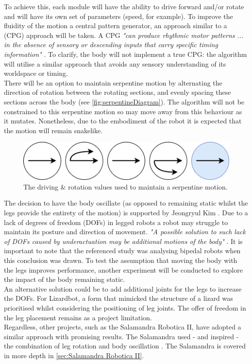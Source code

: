 \documentclass{article}
\begin{document}
\noindent To achieve this, each module will have the ability to drive forward and/or rotate and will have its own set of parameters (speed, for example). To improve the fluidity of the motion a central pattern generator, an approach similar to a (CPG) approach will be taken. A CPG \textit{"can produce rhythmic motor patterns ... in the absence of sensory or descending inputs that carry specific timing information"} . To clarify, the body will not implement a true CPG: the algorithm will utilise a similar approach that avoids any sensory understanding of its worldspace or timing.\\

\noindent There will be an option to maintain serpentine motion by alternating the direction of rotation between the rotating sections, and evenly spacing these sections across the body (see \autoref{fig:serpentineDiagram}). The algorithm will not be constrained to this serpentine motion so may move away from this behaviour as it mutates. Nonetheless, due to the embodiment of the robot it is expected that the motion will remain snakelike.\\
\begin{figure}[H]
\centering
\includegraphics[scale=0.6]{serpentineDiagram}
\caption{The driving \& rotation values used to maintain a serpentine motion.}
\label{fig:serpentineDiagram}
\end{figure}

The decision to have the body oscillate (as opposed to remaining static whilst the legs provide the entirety of the motion) is supported by Jeongryul Kim . Due to a lack of degrees of freedom (DOFs) in legged robots a robot may struggle to maintain its posture and direction of movement. \textit{"A possible solution to such lack of DOFs caused by underactuation may be additional motions of the body"} .
It is important to note that the referenced study was analysing bipedal robots when this conclusion was drawn. To test the assumption that moving the body with the legs improves performance, another experiment will be conducted to explore the impact of the body remaining static. \\
An alternative solution could be to add additional joints for the legs to increase the DOFs. For Lizardbot, a form that mimicked the structure of a lizard was prioritised whilst considering the positioning of leg joints. The offer of freedom in the leg placement remains as a project limitation. \\
Regardless, other projects, such as the Salamandra Robotica II, have adopted a similar approach with promising results. The Salamandra used - and inspired - the combination of leg rotation and body oscillation . The Salamandra is covered in more depth in \ref{sec:Salamandra Robotica II}.
\end{document}
